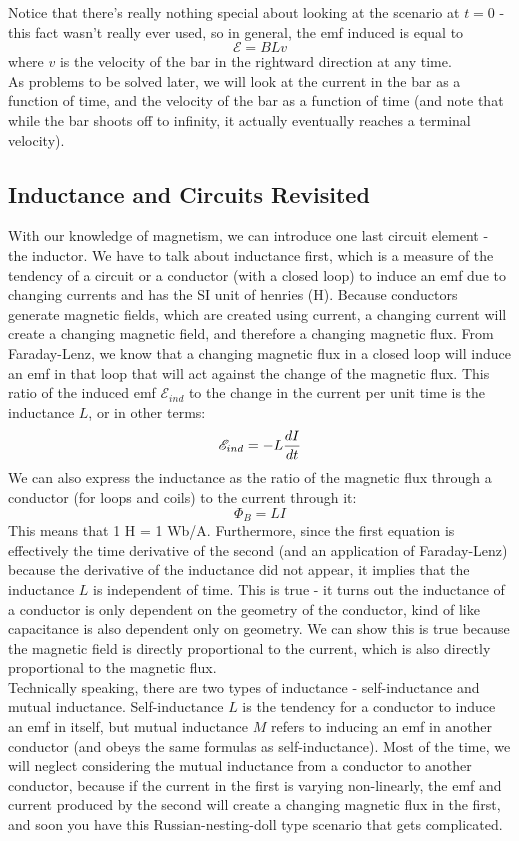 Notice that there's really nothing special about looking at the scenario at $t=0$ - this fact wasn't really ever used, so in general, the emf induced is equal to 
\[
	\mathscr{E} = BLv
\]
where $v$ is the velocity of the bar in the rightward direction at any time. \\
As problems to be solved later, we will look at the current in the bar as a function of time, and the velocity of the bar as a function of time (and note that while the bar shoots off to infinity, it actually eventually reaches a terminal velocity). 
\subsection{Inductance and Circuits Revisited}
With our knowledge of magnetism, we can introduce one last circuit element - the inductor. We have to talk about inductance first, which is a measure of the tendency of a circuit or a conductor (with a closed loop) to induce an emf due to changing currents and has the SI unit of henries (H). Because conductors generate magnetic fields, which are created using current, a changing current will create a changing magnetic field, and therefore a changing magnetic flux. From Faraday-Lenz, we know that a changing magnetic flux in a closed loop will induce an emf in that loop that will act against the change of the magnetic flux. This ratio of the induced emf $\mathscr{E}_{ind}$ to the change in the current per unit time is the inductance $L$, or in other terms:
\[
	\mathscr{E}_{ind} = -L\frac{d I}{d t}
\]
We can also express the inductance as the ratio of the magnetic flux through a conductor (for loops and coils) to the current through it:
\[
	\Phi_B = LI
\]
This means that 1 H = 1 Wb/A. Furthermore, since the first equation is effectively the time derivative of the second (and an application of Faraday-Lenz) because the derivative of the inductance did not appear, it implies that the inductance $L$ is independent of time. This is true - it turns out the inductance of a conductor is only dependent on the geometry of the conductor, kind of like capacitance is also dependent only on geometry. We can show this is true because the magnetic field is directly proportional to the current, which is also directly proportional to the magnetic flux. \\
Technically speaking, there are two types of inductance - self-inductance and mutual inductance. Self-inductance $L$ is the tendency for a conductor to induce an emf in itself, but mutual inductance $M$ refers to inducing an emf in another conductor (and obeys the same formulas as self-inductance). Most of the time, we will neglect considering the mutual inductance from a conductor to another conductor, because if the current in the first is varying non-linearly, the emf and current produced by the second will create a changing magnetic flux in the first, and soon you have this Russian-nesting-doll type scenario that gets complicated. \\
